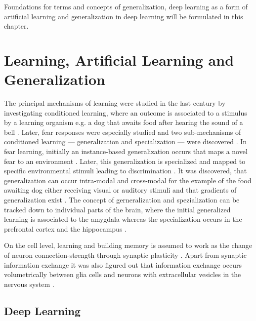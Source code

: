 Foundations for terms and concepts of generalization, deep learning as a form of artificial learning and generalization in deep learning will be formulated in this chapter.

\section{Learning, Artificial Learning and Generalization}

    The principal mechanisms of learning were studied in the last century by investigating conditioned learning, where an outcome is associated to a stimulus by a learning organism e.g. a dog that awaits food after hearing the sound of a bell \citep{pavlov1928conditioned, pavlov2010conditioned, banich2011generalization}. Later, fear responses were especially studied and two sub-mechanisms of conditioned learning --- generalization and specialization --- were discovered \citep{banich2011generalization}.
    In fear learning, initially an instance-based generalization occurs that maps a novel fear to an environment \citep{banich2011generalization}. Later, this generalization is specialized and mapped to specific environmental stimuli leading to discrimination \citep{banich2011generalization}.
    It was discovered, that generalization can occur intra-modal and cross-modal for the example of the food awaiting dog either receiving visual or auditory stimuli \citep{pavlov1928conditioned} and that gradients of generalization exist \citep{guttman1956discriminability}.
    The concept of gerneralization and spezialization can be tracked down to individual parts of the brain, where the initial generalized learning is associated to the amygdala whereas the specialization occurs in the prefrontal cortex and the hippocampus \citep{banich2011generalization}.

    On the cell level, learning and building memory is assumed to work as the change of neuron connection-strength through synaptic plasticity \citep{do1949organization,martin2000synaptic}. Apart from synaptic information exchange it was also figured out that information exchange occurs volumetrically between glia cells and neurons with extracellular vesicles in the nervous system \citep{schiera2019communcation}.

    \subsection{Deep Learning}

